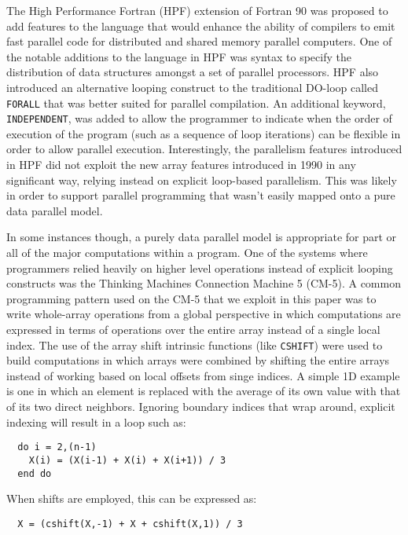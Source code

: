 The High Performance Fortran (HPF) extension of Fortran 90 was
proposed to add features to the language that would enhance the
ability of compilers to emit fast parallel code for distributed and
shared memory parallel computers\cite{koelbel94hpf}.  One of the
notable additions to the language in HPF was syntax to specify the
distribution of data structures amongst a set of parallel processors.
HPF also introduced an alternative looping construct to the
traditional DO-loop called {\tt FORALL} that was better suited for
parallel compilation.  An additional keyword, {\tt INDEPENDENT}, was
added to allow the programmer to indicate when the order of execution
of the program (such as a sequence of loop iterations) can be flexible
in order to allow parallel execution.  Interestingly, the parallelism
features introduced in HPF did not exploit the new array features
introduced in 1990 in any significant way, relying instead on explicit
loop-based parallelism.  This was likely in order to support parallel
programming that wasn't easily mapped onto a pure data parallel model.

In some instances though, a purely data parallel model is appropriate
for part or all of the major computations within a program.  One of
the systems where programmers relied heavily on higher level
operations instead of explicit looping constructs was the Thinking
Machines Connection Machine 5 (CM-5).  A common programming pattern
used on the CM-5 that we exploit in this paper was to write
whole-array operations from a global perspective in which computations
are expressed in terms of operations over the entire array instead of
a single local index.  The use of the array shift intrinsic functions
(like {\tt CSHIFT}) were used to build computations in which arrays
were combined by shifting the entire arrays instead of working based
on local offsets from singe indices.  A simple 1D example is one in
which an element is replaced with the average of its own value with
that of its two direct neighbors.  Ignoring boundary indices that wrap
around, explicit indexing will result in a loop such as:

{\small
\begin{verbatim}
  do i = 2,(n-1)
    X(i) = (X(i-1) + X(i) + X(i+1)) / 3
  end do
\end{verbatim}
}

\noindent When shifts are employed, this can be expressed as:

{\small
\begin{verbatim}
  X = (cshift(X,-1) + X + cshift(X,1)) / 3
\end{verbatim}
}

